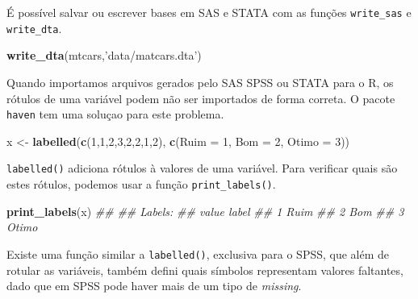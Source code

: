 \documentclass[
]{book}
\newenvironment{Shaded}{\begin{snugshade}}{\end{snugshade}}
\newcommand{\CommentTok}[1]{\textcolor[rgb]{0.56,0.35,0.01}{\textit{#1}}}
\newcommand{\DataTypeTok}[1]{\textcolor[rgb]{0.13,0.29,0.53}{#1}}
\newcommand{\DecValTok}[1]{\textcolor[rgb]{0.00,0.00,0.81}{#1}}
\newcommand{\KeywordTok}[1]{\textcolor[rgb]{0.13,0.29,0.53}{\textbf{#1}}}
\newcommand{\NormalTok}[1]{#1}
\newcommand{\StringTok}[1]{\textcolor[rgb]{0.31,0.60,0.02}{#1}}
\begin{document}
É possível salvar ou escrever bases em SAS e STATA com as funções \texttt{write\_sas} e \texttt{write\_dta}.

\begin{Shaded}
\begin{Highlighting}[]
\KeywordTok{write_dta}\NormalTok{(mtcars,}\StringTok{'data/matcars.dta'}\NormalTok{)}
\end{Highlighting}
\end{Shaded}

Quando importamos arquivos gerados pelo SAS SPSS ou STATA para o R, os rótulos de uma variável podem não ser importados de forma correta. O pacote \texttt{haven} tem uma soluçao para este problema.

\begin{Shaded}
\begin{Highlighting}[]
\NormalTok{x <-}\StringTok{ }\KeywordTok{labelled}\NormalTok{(}\KeywordTok{c}\NormalTok{(}\DecValTok{1}\NormalTok{,}\DecValTok{1}\NormalTok{,}\DecValTok{2}\NormalTok{,}\DecValTok{3}\NormalTok{,}\DecValTok{2}\NormalTok{,}\DecValTok{2}\NormalTok{,}\DecValTok{1}\NormalTok{,}\DecValTok{2}\NormalTok{), }\KeywordTok{c}\NormalTok{(}\DataTypeTok{Ruim =} \DecValTok{1}\NormalTok{, }\DataTypeTok{Bom =} \DecValTok{2}\NormalTok{, }\DataTypeTok{Otimo =} \DecValTok{3}\NormalTok{))}
\end{Highlighting}
\end{Shaded}

\texttt{labelled()} adiciona rótulos à valores de uma variável. Para verificar quais são estes rótulos, podemos usar a função \texttt{print\_labels()}.

\begin{Shaded}
\begin{Highlighting}[]
\KeywordTok{print_labels}\NormalTok{(x)}
\CommentTok{## }
\CommentTok{## Labels:}
\CommentTok{##  value label}
\CommentTok{##      1  Ruim}
\CommentTok{##      2   Bom}
\CommentTok{##      3 Otimo}
\end{Highlighting}
\end{Shaded}

Existe uma função similar a \texttt{labelled()}, exclusiva para o SPSS, que além de rotular as variáveis, também defini quais símbolos representam valores faltantes, dado que em SPSS pode haver mais de um tipo de \emph{missing}.
\end{document}
